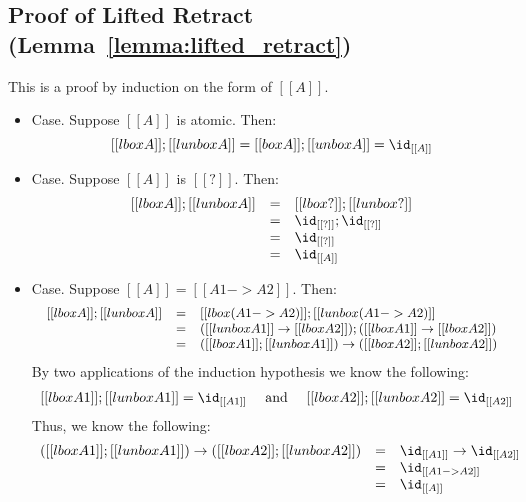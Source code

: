 \subsection{Proof of Lifted Retract (Lemma~\ref{lemma:lifted_retract})}
\label{subsec:proof_of_lifted_retract}
This is a proof by induction on the form of $[[A]]$.

\begin{itemize}
\item[] Case. Suppose $[[A]]$ is atomic.  Then:
  \[
    [[lbox A]];[[lunbox A]] = [[box A]];[[unbox A]] = \id_{[[A]]}
    \]
    
  \item[] Case. Suppose $[[A]]$ is $[[?]]$.  Then:
    \[
    \begin{array}{lll}
      [[lbox A]];[[lunbox A]] & = & [[lbox ?]];[[lunbox ?]]\\
      & = & \id_{[[?]]};\id_{[[?]]}\\
      & = & \id_{[[?]]}\\
      & = & \id_{[[A]]}
    \end{array}
    \]

  \item[] Case. Suppose $[[A]] = [[A1 -> A2]]$.  Then:
    \[\small
    \begin{array}{lll}
      [[lbox A]];[[lunbox A]]
      & = & [[lbox (A1 -> A2)]];[[lunbox (A1 -> A2)]]\\
      & = & ([[lunbox A1]] \to [[lbox A2]]);([[lbox A1]] \to [[lbox A2]])\\
      & = & ([[lbox A1]];[[lunbox A1]]) \to ([[lbox A2]];[[lunbox A2]])\\
    \end{array}
    \]
    By two applications of the induction hypothesis we know the
    following:
    \[
    \begin{array}{lll}
      [[lbox A1]];[[lunbox A1]] = \id_{[[A1]]} & \text{ and } & [[lbox A2]];[[lunbox A2]] = \id_{[[A2]]}
    \end{array}
    \]
    Thus, we know the following:
    \[
    \begin{array}{lll}
      ([[lbox A1]];[[lunbox A1]]) \to ([[lbox A2]];[[lunbox A2]])
      & = & \id_{[[A1]]} \to \id_{[[A2]]}\\
      & = & \id_{[[A1 -> A2]]}\\
      & = & \id_{[[A]]}
    \end{array}
    \]


\end{itemize}
